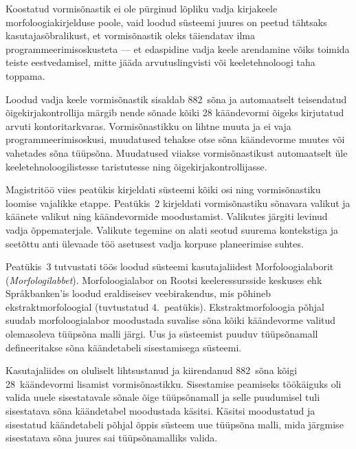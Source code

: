 \documentclass[12pt,a4paper]{article}
\newcommand{\vadja}[1]{\textit{#1}}
\begin{document}
Koostatud vormisõnastik ei ole pürginud lõpliku vadja kirjakeele morfoloogia\-kirjelduse poole, vaid loodud süsteemi juures on peetud tähtsaks kasutaja\-sõbralikust, et vormisõnastik oleks täiendatav ilma programmeerimis\-oskusteta --- %
%
et edaspidine vadja keele arendamine võiks toimida teiste eest\-vedamisel, mitte jääda arvutus\-lingvisti või keele\-tehnoloogi taha toppama.

Loodud vadja keele vormisõnastik sisaldab 882~sõna ja automaatselt teisendatud õigekirjakontrollija märgib nende sõnade kõiki 28 käändevormi õigeks kirjutatud arvuti kontoritarkvaras. Vormisõnastikku on lihtne muuta ja ei vaja programmeerimis\-oskusi, muudatused tehakse otse sõna käändevorme muutes või vahetades sõna tüüpsõna. Muudatused viiakse vormisõnastikust automaatselt üle keeletehnoloogilistesse taristutesse ning õigekirjakontrollijasse.


Magistritöö viies peatükis kirjeldati süsteemi kõiki osi ning vormi\-sõnastiku loomise vajalikke etappe. Peatükis~2 kirjeldati vormi\-sõnastiku sõnavara valikut ja käänete valikut ning käände\-vormide moodustamist. Valikutes järgiti levinud vadja õppe\-materjale. Valikute tegemine on alati seotud suurema kontekstiga ja seetõttu anti ülevaade töö asetusest vadja korpuse planeerimise suhtes.


Peatükis~3 tutvustati töös loodud süsteemi kasutaja\-liidest Morfoloogia\-laborit (\textit{Morfologi\-labbet}). Morfoloogia\-labor on Rootsi keele\-ressursside keskuses ehk Språkbanken'is loodud eraldiseisev veebi\-rakendus, mis põhineb ekstrakt\-morfoloogial (tuvtustatud 4.~peatükis). Ekstrakt\-morfoloogia põhjal suudab morfoloogia\-labor moodustada suvalise sõna kõiki käändevorme valitud olemas\-oleva tüüp\-sõna malli järgi. Uus ja süsteemist puuduv tüüpsõnamall defineeritakse sõna käände\-tabeli sisestamisega süsteemi.

Kasutaja\-liides on oluliselt lihtsustanud ja kiirendanud 882~sõna kõigi 28~käändevormi lisamist vormi\-sõnastikku. Sisestamise peamiseks töökäiguks oli valida uuele sisestatavale sõnale õige tüüpsõnamall ja selle puudumisel tuli sisestatava sõna käände\-tabel moodustada käsitsi. Käsitsi moodustatud ja sisestatud käändetabeli põhjal õppis süsteem uue tüüpsõna malli, mida järgmise sisestatava sõna juures sai tüüp\-sõna\-malliks valida.
\end{document}
